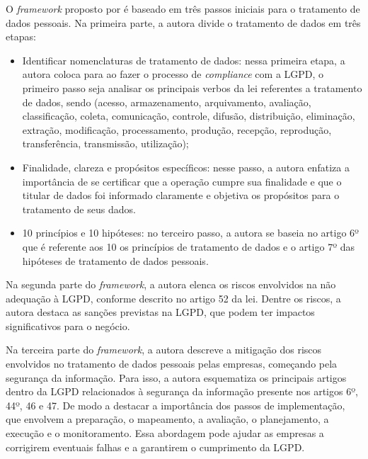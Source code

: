 \documentclass[
	12pt,				%
	openright,			%
	oneside,			%
	a4paper,			%
	english,			%
	french,				%
	spanish,			%
	brazil,				%
	]{abntex2}
\begin{document}

O \textit{framework} proposto por \cite{Zini2020} é baseado em três passos iniciais para o tratamento de dados pessoais. Na primeira parte, a autora divide o tratamento de dados em três etapas:

\begin{itemize}
\item Identificar nomenclaturas de tratamento de dados: nessa primeira etapa, a autora coloca para ao fazer o processo de \textit{compliance} com a LGPD, o primeiro passo seja analisar os principais verbos da lei referentes a tratamento de dados, sendo (acesso, armazenamento, arquivamento, avaliação, classificação, coleta, comunicação, controle, difusão, distribuição, eliminação, extração, modificação, processamento, produção, recepção, reprodução, transferência, transmissão, utilização);
\item Finalidade, clareza e propósitos específicos: nesse passo, a autora enfatiza a importância de se certificar que a operação cumpre sua finalidade e que o titular de dados foi informado claramente e objetiva os propósitos para o tratamento de seus dados.
\item 10 princípios e 10 hipóteses: no terceiro passo, a autora se baseia no artigo 6º que é referente aos 10 os princípios de tratamento de dados e o artigo 7º das hipóteses de tratamento de dados pessoais.
\end{itemize}

Na segunda parte do \textit{framework}, a autora elenca os riscos envolvidos na não adequação à LGPD, conforme descrito no artigo 52 da lei. Dentre os riscos, a autora destaca as sanções previstas na LGPD, que podem ter impactos significativos para o negócio.

Na terceira parte do \textit{framework}, a autora descreve a mitigação dos riscos envolvidos no tratamento de dados pessoais pelas empresas, começando pela segurança da informação. Para isso, a autora esquematiza os principais artigos dentro da LGPD relacionados à segurança da informação presente nos artigos 6º, 44º, 46 e 47. De modo a destacar a importância dos passos de implementação, que envolvem a preparação, o mapeamento, a avaliação, o planejamento, a execução e o monitoramento. Essa abordagem pode ajudar as empresas a corrigirem eventuais falhas e a garantirem o cumprimento da LGPD.
\end{document}
